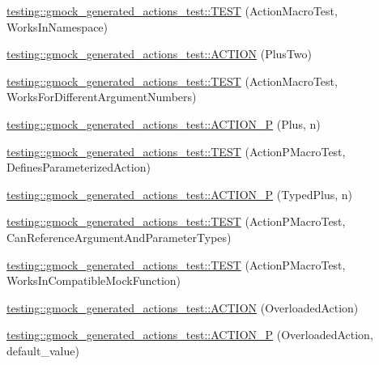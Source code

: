\begin{DoxyCompactItemize}
\item 
\mbox{\hyperlink{namespacetesting_1_1gmock__generated__actions__test_af75a9a5b9d6a1cf718a58f030a5a9133}{testing\+::gmock\+\_\+generated\+\_\+actions\+\_\+test\+::\+T\+E\+ST}} (Action\+Macro\+Test, Works\+In\+Namespace)
\item 
\mbox{\hyperlink{namespacetesting_1_1gmock__generated__actions__test_a0eef2f885ccb1e4fac88a910f0fc5c2e}{testing\+::gmock\+\_\+generated\+\_\+actions\+\_\+test\+::\+A\+C\+T\+I\+ON}} (Plus\+Two)
\item 
\mbox{\hyperlink{namespacetesting_1_1gmock__generated__actions__test_acb98f6208678d9f5500a0c2c095b8cd0}{testing\+::gmock\+\_\+generated\+\_\+actions\+\_\+test\+::\+T\+E\+ST}} (Action\+Macro\+Test, Works\+For\+Different\+Argument\+Numbers)
\item 
\mbox{\hyperlink{namespacetesting_1_1gmock__generated__actions__test_ac081154b3ae2f099bd5be853cacfdaa4}{testing\+::gmock\+\_\+generated\+\_\+actions\+\_\+test\+::\+A\+C\+T\+I\+O\+N\+\_\+P}} (Plus, n)
\item 
\mbox{\hyperlink{namespacetesting_1_1gmock__generated__actions__test_a42a5fe606ca18b2eb1e5d7884045118f}{testing\+::gmock\+\_\+generated\+\_\+actions\+\_\+test\+::\+T\+E\+ST}} (Action\+P\+Macro\+Test, Defines\+Parameterized\+Action)
\item 
\mbox{\hyperlink{namespacetesting_1_1gmock__generated__actions__test_a3bcd440e11ab64ad5eb007efce33cf7d}{testing\+::gmock\+\_\+generated\+\_\+actions\+\_\+test\+::\+A\+C\+T\+I\+O\+N\+\_\+P}} (Typed\+Plus, n)
\item 
\mbox{\hyperlink{namespacetesting_1_1gmock__generated__actions__test_a4262c10efb367abf9771b3060c57d190}{testing\+::gmock\+\_\+generated\+\_\+actions\+\_\+test\+::\+T\+E\+ST}} (Action\+P\+Macro\+Test, Can\+Reference\+Argument\+And\+Parameter\+Types)
\item 
\mbox{\hyperlink{namespacetesting_1_1gmock__generated__actions__test_ab545244777c7559d1b0c2c63ee2be134}{testing\+::gmock\+\_\+generated\+\_\+actions\+\_\+test\+::\+T\+E\+ST}} (Action\+P\+Macro\+Test, Works\+In\+Compatible\+Mock\+Function)
\item 
\mbox{\hyperlink{namespacetesting_1_1gmock__generated__actions__test_a24927d97882dc1d52e203720df804188}{testing\+::gmock\+\_\+generated\+\_\+actions\+\_\+test\+::\+A\+C\+T\+I\+ON}} (Overloaded\+Action)
\item 
\mbox{\hyperlink{namespacetesting_1_1gmock__generated__actions__test_a1ee92e8b8bd6a5a54f5d2fcdb9f122b8}{testing\+::gmock\+\_\+generated\+\_\+actions\+\_\+test\+::\+A\+C\+T\+I\+O\+N\+\_\+P}} (Overloaded\+Action, default\+\_\+value)

\end{DoxyCompactItemize}
